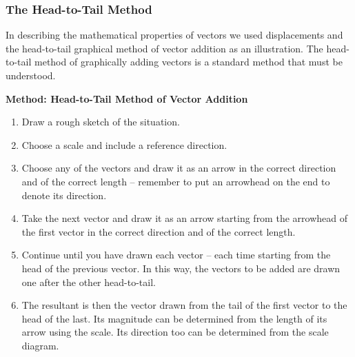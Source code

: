 \subsubsection{The Head-to-Tail Method}
In describing the mathematical properties of vectors we used
displacements and the head-to-tail graphical method of vector addition
as an illustration. The head-to-tail method of graphically adding vectors is a standard method that must be understood.\\

\begin{minipage}{\textwidth}
\textbf{Method: Head-to-Tail Method of Vector Addition}
\begin{enumerate}
\item{Draw a rough sketch of the situation.}
\item{Choose a scale and include a reference direction.}
\item{Choose any of the vectors and draw it as an arrow in the
correct direction and of the correct length -- remember to put an
arrowhead on the end to denote its direction.}
\item{Take the next vector and draw it as an arrow starting from the
arrowhead of the first vector in the correct direction and of the
correct length.}
\item{Continue until you have drawn each vector -- each time starting
from the head of the previous vector. In this way, the vectors to be
added are drawn one after the other head-to-tail.}
\item{The resultant is then the vector drawn from the tail of the
first vector to the head of the last. Its magnitude can be
determined from the length of its arrow using the scale. Its
direction too can be determined from the scale diagram.}
\end{enumerate}
\end{minipage}

